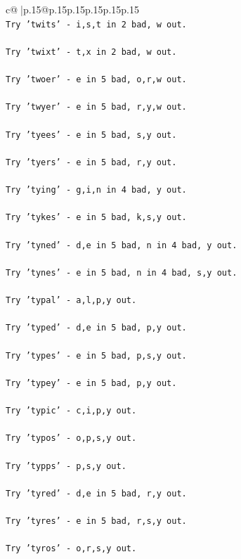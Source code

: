 \documentclass{article}
\begin{document}
{\begin{supertabular}{c@{$\;$}|p{.15\linewidth}@{}p{.15\linewidth}p{.15\linewidth}p{.15\linewidth}p{.15\linewidth}p{.15\linewidth}}
{{{\\ 
\texttt{Try 'twits' {-} i,s,t in 2 bad, w out.} \\
\\ 
\texttt{Try 'twixt' {-} t,x in 2 bad, w out.} \\
\\ 
\texttt{Try 'twoer' {-} e in 5 bad, o,r,w out.} \\
\\ 
\texttt{Try 'twyer' {-} e in 5 bad, r,y,w out.} \\
\\ 
\texttt{Try 'tyees' {-} e in 5 bad, s,y out.} \\
\\ 
\texttt{Try 'tyers' {-} e in 5 bad, r,y out.} \\
\\ 
\texttt{Try 'tying' {-} g,i,n in 4 bad, y out.} \\
\\ 
\texttt{Try 'tykes' {-} e in 5 bad, k,s,y out.} \\
\\ 
\texttt{Try 'tyned' {-} d,e in 5 bad, n in 4 bad, y out.} \\
\\ 
\texttt{Try 'tynes' {-} e in 5 bad, n in 4 bad, s,y out.} \\
\\ 
\texttt{Try 'typal' {-} a,l,p,y out.} \\
\\ 
\texttt{Try 'typed' {-} d,e in 5 bad, p,y out.} \\
\\ 
\texttt{Try 'types' {-} e in 5 bad, p,s,y out.} \\
\\ 
\texttt{Try 'typey' {-} e in 5 bad, p,y out.} \\
\\ 
\texttt{Try 'typic' {-} c,i,p,y out.} \\
\\ 
\texttt{Try 'typos' {-} o,p,s,y out.} \\
\\ 
\texttt{Try 'typps' {-} p,s,y out.} \\
\\ 
\texttt{Try 'tyred' {-} d,e in 5 bad, r,y out.} \\
\\ 
\texttt{Try 'tyres' {-} e in 5 bad, r,s,y out.} \\
\\ 
\texttt{Try 'tyros' {-} o,r,s,y out.} \\
}}}
\end{supertabular}}
\end{document}
